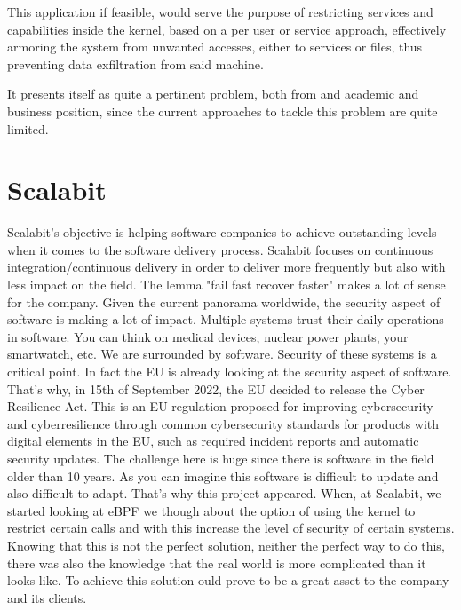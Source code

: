 This application if feasible, would serve the purpose of restricting services and capabilities inside the kernel, based on a per user or service approach, effectively armoring the system from unwanted accesses, either to services or files, thus preventing data exfiltration from said machine.

It presents itself as quite a pertinent problem, both from and academic and business position, since the current approaches to tackle this problem are quite limited.

\section{Scalabit}
Scalabit's objective is helping software companies to achieve outstanding levels when it comes to the software delivery process. Scalabit focuses on continuous integration/continuous delivery in order to deliver more frequently but also with less impact on the field. The lemma "fail fast recover faster" makes a lot of sense for the company.
Given the current panorama worldwide, the security aspect of software is making a lot of impact.
Multiple systems trust their daily operations in software. You can think on medical devices, nuclear power plants, your smartwatch, etc.
We are surrounded by software.
Security of these systems is a critical point. In fact the EU is already looking at the security aspect of software. That's why, in 15th of September 2022, the EU decided to release the Cyber Resilience Act.
This is an EU regulation proposed for improving cybersecurity and cyberresilience through common cybersecurity standards for products with digital elements in the EU, such as required incident reports and automatic security updates.
The challenge here is huge since there is software in the field older than 10 years.
As you can imagine this software is difficult to update and also difficult to adapt.
That's why this project appeared. When, at Scalabit, we started looking at eBPF we though about the option of using the kernel to restrict certain calls and with this increase the level of security of certain systems.
Knowing that this is not the perfect solution, neither the perfect way to do this, there was also the knowledge that the real world is more complicated than it looks like. To achieve this solution ould prove to be a great asset to the company and its clients.


